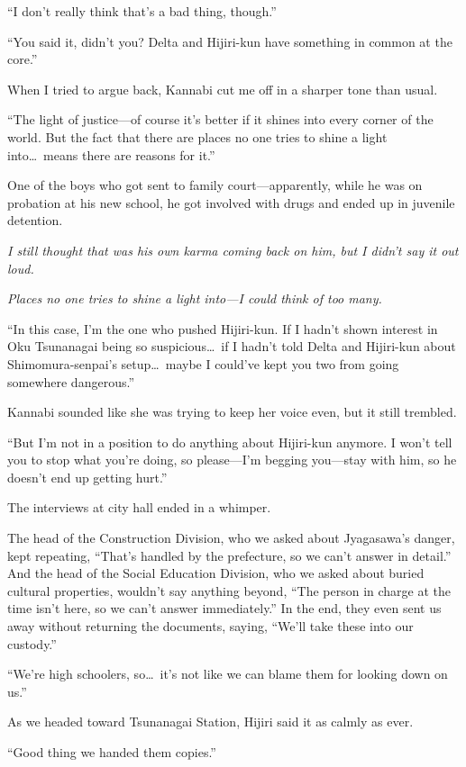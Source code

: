 \documentclass[
    a4paper,
    12pt,
    twoside,
    openany,
    UTF8,
    fontset=windows
]{ctexbook}
\begin{document}
``I don't really think that's a bad thing, though.''

``You said it, didn't you? Delta and Hijiri-kun have something in common at the core.''

When I tried to argue back, Kannabi cut me off in a sharper tone than usual.

``The light of justice---of course it's better if it shines into every corner of the world. But the fact that there are places no one tries to shine a light into\dots\ means there are reasons for it.''

One of the boys who got sent to family court---apparently, while he was on probation at his new school, he got involved with drugs and ended up in juvenile detention.

\textit{I still thought that was his own karma coming back on him, but I didn't say it out loud.}

\textit{Places no one tries to shine a light into---I could think of too many.}

``In this case, I'm the one who pushed Hijiri-kun. If I hadn't shown interest in Oku Tsunanagai being so suspicious\dots\ if I hadn't told Delta and Hijiri-kun about Shimomura-senpai's setup\dots\ maybe I could've kept you two from going somewhere dangerous.''

Kannabi sounded like she was trying to keep her voice even, but it still trembled.

``But I'm not in a position to do anything about Hijiri-kun anymore. I won't tell you to stop what you're doing, so please---I'm begging you---stay with him, so he doesn't end up getting hurt.''

The interviews at city hall ended in a whimper.

The head of the Construction Division, who we asked about Jyagasawa's danger, kept repeating, ``That's handled by the prefecture, so we can't answer in detail.'' And the head of the Social Education Division, who we asked about buried cultural properties, wouldn't say anything beyond, ``The person in charge at the time isn't here, so we can't answer immediately.'' In the end, they even sent us away without returning the documents, saying, ``We'll take these into our custody.''

``We're high schoolers, so\dots\ it's not like we can blame them for looking down on us.''

As we headed toward Tsunanagai Station, Hijiri said it as calmly as ever.

``Good thing we handed them copies.''
\end{document}
